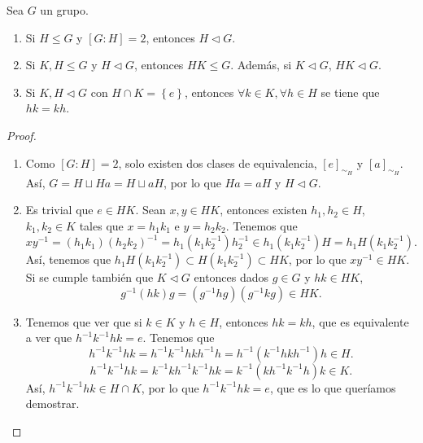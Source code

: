 \begin{prop}
Sea $\displaystyle G $ un grupo. 
\begin{enumerate}
	\item Si $\displaystyle H \leq G $ y $\displaystyle [G:H] = 2 $, entonces $\displaystyle H \lhd G $.
	\item Si $\displaystyle K,H \leq G $ y $\displaystyle H \lhd G $, entonces $\displaystyle HK \leq G $. Además, si $\displaystyle K\lhd G $, $\displaystyle HK \lhd G $.
	\item Si $\displaystyle K,H \lhd G $ con $\displaystyle H \cap K = \left\{ e\right\}  $, entonces $\displaystyle \forall k \in K, \forall h \in H $ se tiene que $\displaystyle h k = kh $.
\end{enumerate}
\end{prop}
\begin{proof}
	\begin{enumerate}
	\item Como $\displaystyle [G:H] = 2 $, solo existen dos clases de equivalencia, $\displaystyle [e]_{\sim_{H}} $ y $\displaystyle [a]_{\sim_{H}} $. Así, $\displaystyle G = H \sqcup Ha = H \sqcup aH $, por lo que $\displaystyle Ha = aH $ y $\displaystyle H \lhd G $.
	\item Es trivial que $\displaystyle e \in HK $. Sean $\displaystyle x,y \in HK $, entonces existen $\displaystyle h_{1}, h_{2} \in H $, $\displaystyle k_{1}, k_{2} \in K $ tales que $\displaystyle x = h_{1}k_{1} $ e $\displaystyle y = h_{2}k_{2} $. Tenemos que
		\[xy^{-1} = \left(h_{1}k_{1}\right)\left(h_{2}k_{2}\right)^{-1} = h_{1}\left(k_{1}k_{2}^{-1}\right)h_{2}^{-1} \in h_{1}\left(k_{1}k_{2}^{-1}\right)  H = h_{1}H\left(k_{1}k_{2}^{-1}\right) .\]
Así, tenemos que $\displaystyle h_{1}H\left(k_{1}k_{2}^{-1}\right) \subset H\left(k_{1}k_{2}^{-1}\right) \subset HK $, por lo que $\displaystyle xy^{-1} \in HK $. Si se cumple también que $\displaystyle K \lhd G $ entonces dados $\displaystyle g \in G $ y $\displaystyle hk \in HK $,
\[g^{-1}\left(hk\right)g = \left(g^{-1}hg\right)\left(g^{-1}kg\right) \in HK .\]
\item Tenemos que ver que si $\displaystyle k \in K $ y $\displaystyle h \in H $, entonces $\displaystyle hk = kh $, que es equivalente a ver que $\displaystyle h^{-1}k^{-1}hk = e $. Tenemos que
	\[h^{-1}k^{-1}hk = h^{-1}k^{-1}hkh^{-1}h = h^{-1}\left(k^{-1}hkh^{-1}\right)h \in H .\]
	\[h^{-1}k^{-1}hk = k^{-1}k h^{-1}k^{-1}hk = k^{-1}\left(kh^{-1}k^{-1}h\right)k \in K .\]
	Así, $\displaystyle h^{-1}k^{-1}hk \in H \cap K $, por lo que $\displaystyle h^{-1}k^{-1}hk = e $, que es lo que queríamos demostrar. 
	\end{enumerate}
\end{proof}
